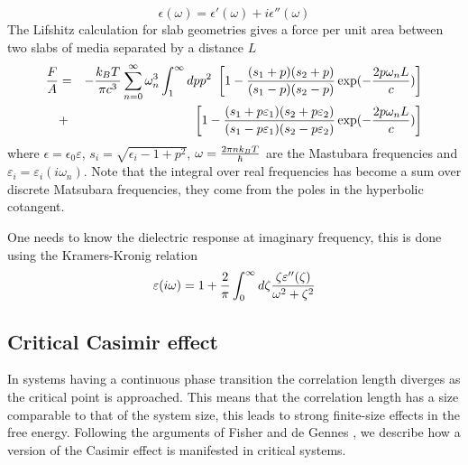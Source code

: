 \begin{equation}
\epsilon(\omega) = \epsilon'(\omega)+i\epsilon''(\omega)
\end{equation}
The Lifshitz calculation for slab geometries gives a force per unit area between two slabs of media separated by a distance $L$
\begin{eqnarray}
{F\over A} &=& -{k_BT \over \pi c^3}\sum_{n=0}^\infty \omega_n^3 \int_1^\infty dp p^2 \ 
\left[ 1-{(s_1+p)(s_2+p)\over (s_1-p)(s_2-p)}\exp(-{2p\omega_n L\over c})\right]\nonumber \\
&+&\left[ 1-{(s_1+p\varepsilon_1)(s_2+p\varepsilon_2)\over (s_1-p\varepsilon_1)(s_2-p\varepsilon_2)}\exp(-{2p\omega_n L\over c})\right]
\end{eqnarray}
where $\epsilon = \epsilon_0\varepsilon$, $s_i = \sqrt{\epsilon_i -1 +p^2}$,
$\omega = {2\pi nk_BT \over \hbar}$ are the Mastubara frequencies \cite{matsubara_new_1955} and ${\varepsilon_i
=\varepsilon_i(i\omega_n)}$. Note that the integral over real frequencies has become a sum over discrete Matsubara frequencies, they come from the poles in the hyperbolic cotangent.

One needs to know the dielectric response at imaginary frequency, this is done using the Kramers-Kronig relation
\begin{equation}
\varepsilon(i\omega)= 1 +{2\over \pi}\int_0^\infty d\zeta {\zeta \varepsilon''(\zeta)\over \omega^2 + \zeta^2}
\end{equation}


\subsection{Critical Casimir effect}

{\color{red}
In systems having a continuous phase transition the correlation length diverges as the critical point is approached. This means that the correlation length has a size comparable to that of the system size, this  leads to strong finite-size effects in the free energy. Following the arguments of Fisher and de Gennes \cite{gambassi_casimir_2009}, we describe how a version of  the Casimir effect is manifested in  critical systems. 
}
